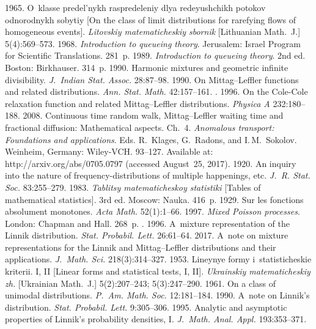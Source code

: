 \begin{multicols}{2}
{{\begin{thebibliography}{99}
 1965. 
O~klasse predel'nykh raspredeleniy dlya redeyushchikh potokov odnorodnykh sobytiy 
[On the class of limit distributions for rarefying flows of homogeneous events]. 
\textit{Litovskiy matematicheskiy sbornik} [Lithuanian Math.~J.] 5(4):569--573.
 1968. 
\textit{Introduction to queueing theory}. Jerusalem: 
Israel Program for Scientific Translations. 281~p.
 1989. 
\textit{Introduction to queueing theory}. 2nd ed.
Boston: Birkhauser. 314~p.
 1990. 
Harmonic mixtures and geometric infinite divisibility. \textit{J.~Indian
Stat. Assoc.} 28:87--98.
 1990. On Mittag--Leffler functions and
 related distributions. \textit{Ann. Stat. Math.} 42:157--161.
. 1996. 
On the Cole-Cole relaxation function and related Mittag--Leffler distributions. 
\textit{Physica A} 232:180--188.
 2008. Continuous time random walk, 
Mittag--Leffler waiting time and fractional diffusion: Mathematical aspects. 
Ch.~4.
\textit{Anomalous transport: Foundations and applications}. 
Eds. R.~Klages, G.~Radons, and I.\,M.~Sokolov. Weinheim, Germany: 
Wiley-VCH.   93--127.
Available at: {\sf http://arxiv.org/abs/0705.0797}
(accessed August~25, 2017).
 1920. 
An inquiry into the nature of frequency-distributions of multiple happenings, etc. 
\textit{J.~R. Stat. Soc.} 83:255--279.
 1983. 
\textit{Tablitsy ma\-te\-ma\-ti\-che\-skoy statistiki} 
[Tables of mathematical statistics].  3rd ed. Moscow: Nauka. 416~p.
 1929. Sur les fonctions absolument monotones. 
\textit{Acta Math.} 52(1):1--66.
 1997. \textit{Mixed Poisson processes}. 
London: Chapman and Hall. 268~p.
. 1996. 
A~mixture representation of the Linnik distribution. 
\textit{Stat. Probabil. Lett.} 26:61--64.
 2017. 
A~note on mixture representations for the Linnik and Mittag--Leffler distributions 
and their applications. \textit{J.~Math. Sci.} 218(3):314--327.
 1953. Lineynye formy i~statisticheskie kriterii. I, II 
[Linear forms and statistical tests, I, II]. 
\textit{Ukrainskiy matematicheskiy zh.} [Ukrainian Math.~J.] 5(2):207--243; 
5(3):247--290.
 1961. On a class of unimodal distributions. 
\textit{P.~Am. Math. Soc.} 12:181--184.
 1990. A~note on Linnik's distribution. 
\textit{Stat. Probabil. Lett.} 9:305--306.
 1995. 
Analytic and asymptotic properties of Linnik's probability densities, I. 
\textit{J.~Math. Anal. Appl.} 193:353--371.


\end{thebibliography}}}
\end{multicols}
